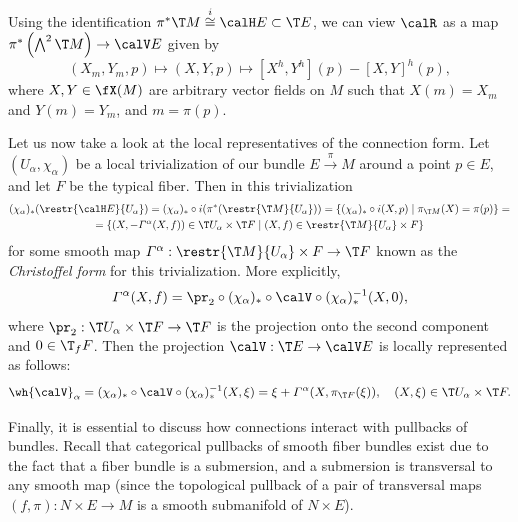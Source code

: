 \begin{cor}\label{cor curvature in terms of hor}
    Using the identification $\pi^\ast \T M\overset{i}{\cong}\calH E\subset \T E$, we can view $\calR$ as a map $\pi^\ast\left(\bigwedge\nolimits^2\T M\right)\to \calV E$ given by 
    \[(X_m,Y_m,p)\mapsto (X,Y,p)\mapsto [X^h,Y^h](p)-[X,Y]^h(p),\]
    where $X,Y\in \fX(M)$ are arbitrary vector fields on $M$ such that $X(m)=X_m$ and $Y(m)=Y_m$, and $m=\pi(p)$.
\end{cor}

Let us now take a look at the local representatives of the connection form. Let $(U_\alpha,\chi_\alpha)$ be a local trivialization of our bundle $E\overset{\pi}{\to}M$ around a point $p\in E$, and let $F$ be the typical fiber. Then in this trivialization
\begin{multline}
    (\chi_\alpha)_\ast(\restr{\calH E}{U_\alpha})=(\chi_\alpha)_\ast\circ i(\pi^\ast (\restr{\T M}{U_\alpha}))=\{(\chi_\alpha)_\ast\circ i(X,p)\mid \pi_{\T M}(X)=\pi(p)\}=\\
    =\{(X,-\varGamma^\alpha(X,f))\in \T U_\alpha\times \T F\mid (X,f)\in \restr{\T M}{U_\alpha}\times F\}
\end{multline}
for some smooth map $\varGamma^\alpha:\restr{\T M}{U_\alpha}\times F\to \T F$ known as the \emph{Christoffel form} for this trivialization. More explicitly,
\[\varGamma^\alpha(X,f)=\pr_2\circ (\chi_\alpha)_\ast\circ \calV\circ (\chi_\alpha)_\ast^{-1}(X,0),\]
where $\pr_2:\T U_\alpha\times \T F\to \T F$ is the projection onto the second component and $0 \in \T_fF$. Then the projection $\calV:\T E\to \calV E$ is locally represented as follows:
\[\wh{\calV}_\alpha=(\chi_\alpha)_\ast\circ \calV\circ (\chi_\alpha)_\ast^{-1}(X,\xi)=\xi+\varGamma^\alpha(X,\pi_{\T F}(\xi)),\quad (X,\xi)\in \T U_\alpha\times \T F.\]

Finally, it is essential to discuss how connections interact with pullbacks of bundles. Recall that categorical pullbacks of smooth fiber bundles exist due to the fact that a fiber bundle is a submersion, and a submersion is transversal to any smooth map (since the topological pullback of a pair of transversal maps $(f,\pi):N\times E\to M$ is a smooth submanifold of $N\times E$).

